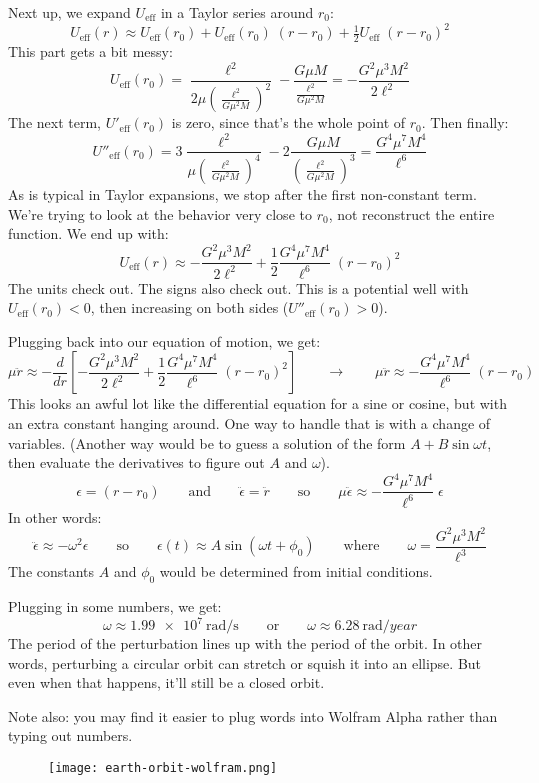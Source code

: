 \documentclass[12pt]{article}
\begin{document}
{Next up, we expand $U_\text{eff}$ in a Taylor series around $r_0$:
$$
U_\text{eff}(r) \approx U_\text{eff}(r_0) + U_\text{eff}(r_0)\; (r - r_0) + \tfrac{1}{2} U_\text{eff} \; (r - r_0)^2
$$
This part gets a bit messy:
$$
U_\text{eff}(r_0) = 
\frac{\ell^2}{2 \mu \left(\frac{\ell^2}{G \mu^2 M}\right)^2} -\frac{G \mu M}{\frac{\ell^2}{G \mu^2 M}}
=
-\frac{G^2 \mu^3 M^2}{2 \ell^2}
$$
The next term, $U'_\text{eff}(r_0)$ is zero, since that's the whole point of $r_0$. Then finally:
$$
U''_\text{eff}(r_0) = 
3 \frac{\ell^2}{\mu \left(\frac{\ell^2}{G \mu^2 M}\right)^4} - 2 \frac{G \mu M}{\left( \frac{\ell^2}{G \mu^2 M} \right)^3}
=
\frac{G^4 \mu^7 M^4}{\ell^6}
$$
As is typical in Taylor expansions, we stop after the first non-constant term. We're trying to look at the behavior very close to $r_0$, not reconstruct the entire function. We end up with:
$$
U_\text{eff} (r) \approx -\frac{G^2 \mu^3 M^2}{2 \ell^2} + \frac{1}{2} \frac{G^4 \mu^7 M^4}{\ell^6} \; (r - r_0)^2
$$
The units check out. The signs also check out. This is a potential well with $U_\text{eff}(r_0) < 0$, then increasing on both sides ($U''_\text{eff}(r_0) > 0$). 

Plugging back into our equation of motion, we get:
$$
\mu \ddot{r} \approx -\frac{d}{dr} \left[ -\frac{G^2 \mu^3 M^2}{2 \ell^2} + \frac{1}{2} \frac{G^4 \mu^7 M^4}{\ell^6} \; (r - r_0)^2 \right]
\quad\quad\rightarrow\quad\quad
\mu \ddot{r} \approx - \frac{G^4 \mu^7 M^4}{\ell^6} \; (r - r_0)
$$
This looks an awful lot like the differential equation for a sine or cosine, but with an extra constant hanging around. One way to handle that is with a change of variables. (Another way would be to guess a solution of the form $A + B \sin \omega t$, then evaluate the derivatives to figure out $A$ and $\omega$).
$$
\epsilon = (r - r_0)
\quad\quad\text{and}\quad\quad
\ddot{\epsilon} = \ddot{r}
\quad\quad\text{so}\quad\quad
\mu \ddot{\epsilon} \approx -\frac{G^4 \mu^7 M^4}{\ell^6} \; \epsilon
$$
In other words:
$$
\ddot{\epsilon} \approx -\omega^2 \epsilon
\quad\quad\text{so}\quad\quad
\epsilon(t) \approx A \sin(\omega t + \phi_0)
\quad\quad\text{where}\quad\quad
\omega = \frac{G^2 \mu^3 M^2}{\ell^3}
$$
The constants $A$ and $\phi_0$ would be determined from initial conditions.

Plugging in some numbers, we get:
$$
\omega \approx \SI{1.99e7}{\radian/\second}
\quad\quad\text{or}\quad\quad
\omega \approx \SI{6.28}{\radian/year}
$$
The period of the perturbation lines up with the period of the orbit. In other words, perturbing a circular orbit can stretch or squish it into an ellipse. But even when that happens, it'll still be a closed orbit.

Note also: you may find it easier to plug words into Wolfram Alpha rather than typing out numbers.

\begin{figure}[h]
\texttt{[image: earth-orbit-wolfram.png]}
\centering
\end{figure}


}
\end{document}
